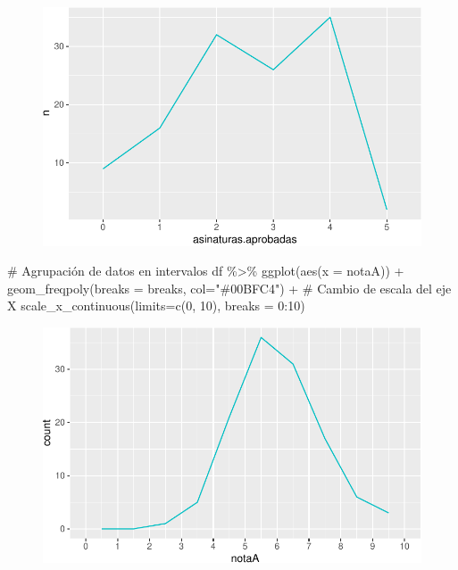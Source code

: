 \documentclass[
  a4paper,
]{scrreport}
\newenvironment{Shaded}{\begin{snugshade}}{\end{snugshade}}
\newcommand{\AttributeTok}[1]{\textcolor[rgb]{0.40,0.45,0.13}{#1}}
\newcommand{\CommentTok}[1]{\textcolor[rgb]{0.37,0.37,0.37}{#1}}
\newcommand{\DecValTok}[1]{\textcolor[rgb]{0.68,0.00,0.00}{#1}}
\newcommand{\FunctionTok}[1]{\textcolor[rgb]{0.28,0.35,0.67}{#1}}
\newcommand{\NormalTok}[1]{\textcolor[rgb]{0.00,0.23,0.31}{#1}}
\newcommand{\SpecialCharTok}[1]{\textcolor[rgb]{0.37,0.37,0.37}{#1}}
\newcommand{\StringTok}[1]{\textcolor[rgb]{0.13,0.47,0.30}{#1}}
\theoremstyle{definition}
\theoremstyle{definition}
\theoremstyle{remark}
\begin{document}
\begin{figure}[H]

{\centering \includegraphics{./08-analisis-estadisticos_files/figure-pdf/unnamed-chunk-13-1.pdf}

}

\end{figure}

\begin{Shaded}
\begin{Highlighting}[]
\CommentTok{\# Agrupación de datos en intervalos}
\NormalTok{df }\SpecialCharTok{\%\textgreater{}\%} \FunctionTok{ggplot}\NormalTok{(}\FunctionTok{aes}\NormalTok{(}\AttributeTok{x =}\NormalTok{ notaA)) }\SpecialCharTok{+} 
  \FunctionTok{geom\_freqpoly}\NormalTok{(}\AttributeTok{breaks =}\NormalTok{ breaks, }\AttributeTok{col=}\StringTok{"\#00BFC4"}\NormalTok{) }\SpecialCharTok{+} 
  \CommentTok{\# Cambio de escala del eje X}
  \FunctionTok{scale\_x\_continuous}\NormalTok{(}\AttributeTok{limits=}\FunctionTok{c}\NormalTok{(}\DecValTok{0}\NormalTok{, }\DecValTok{10}\NormalTok{), }\AttributeTok{breaks =} \DecValTok{0}\SpecialCharTok{:}\DecValTok{10}\NormalTok{) }
\end{Highlighting}
\end{Shaded}

\begin{figure}[H]

{\centering \includegraphics{./08-analisis-estadisticos_files/figure-pdf/unnamed-chunk-14-1.pdf}

}

\end{figure}
\end{document}
